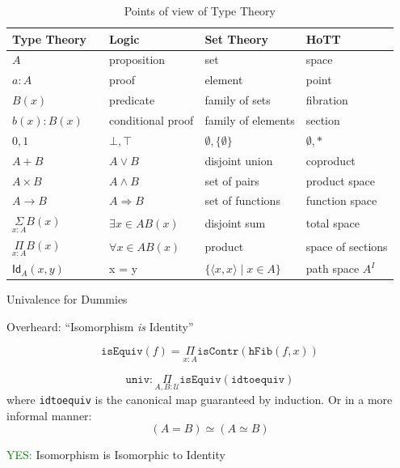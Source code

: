 \documentclass[8pt]{beamer}
\begin{document}
\begin{frame}

\begin{table}[htb]
  \centering
 \begin{tabular}{lllll}
   \hline
   \textbf{Type Theory} && \textbf{Logic} & \textbf{Set Theory} & \textbf{HoTT}\\ %
   \hline
   $A$ && proposition & set & space\\ %
   $a:A$ && proof & element & point \\ %
   $B(x)$ && predicate & family of sets & fibration \\ %
   $b(x) : B(x)$ && conditional proof & family of elements & section\\ %
   $0, 1$ && $\bot, \top$ & $\emptyset, \{ \emptyset \}$ & $\emptyset, *$\\ %
   $A + B$ && $A\vee B$ & disjoint union & coproduct\\ %
   $A\times B$ && $A\wedge B$ & set of pairs & product space\\ %
   $A\to B$ && $A\Rightarrow B$ & set of functions & function space\\ %
   $\underset{x \colon A}{\Sigma} B(x)$ &&  $\exists x \in A B(x)$ & disjoint sum & total space\\ %
   $\underset{x \colon A}{\Pi} B(x)$ &&  $\forall x \in A B(x)$ & product & space of sections\\ %
   $\mathsf{Id}_{A}(x,y)$ && x = y & $\{ \langle x,x\rangle \mid x\in A\}$ & path space $A^I$ \\ %
   \hline
  \end{tabular}
  \caption{Points of view of Type Theory}\label{tab:pov}
\end{table}


\end{frame}

\begin{frame}{Univalence for Dummies}

  Overheard: ``Isomorphism \emph{is} Identity''

\bigskip

\[
\mathtt{isEquiv} (f) = \underset{x \colon A}{\Pi} \mathtt{isContr}( \mathtt{hFib} (f,x))
\]

\[
\mathtt{univ} \colon \underset{A,B \colon \mathcal{U}}{\Pi} \mathtt{isEquiv} (\mathtt{idtoequiv})
\]
where \texttt{idtoequiv} is the canonical map guaranteed by
induction. Or in a more informal manner:
\[
(A = B) \simeq (A \simeq B) 
\]

\textcolor{green}{YES:} Isomorphism is Isomorphic to Identity

\end{frame}
\end{document}

